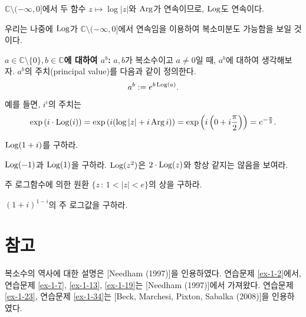$\mathbb C \setminus (-\infty,0]$에서 두 함수  $z\mapsto \log |z|$와 $\mathop{\mathrm{Arg}}$가 
연속이므로, $\mathop{\mathrm{Log}}$도 연속이다.

우리는 나중에 $\mathop{\mathrm{Log}}$가 $\mathbb C \setminus (-\infty,0]$에서 연속임을 이용하여
복소미분도 가능함을 보일 것이다.

{\bf $a\in \mathbb C\setminus \{0\}, b\in\mathbb C$에 대하여 $a^b$: }
$a,b$가 복소수이고 $a\ne0$일 때, $a^b$에 대하여 생각해보자.
$a^b$의 주치(principal value)를 다음과 같이 정의한다.
$$
a^b := e^{b\mathop{\mathrm{Log}}(a)}.
$$
예를 들면, $i^i$의 주치는
$$
\exp\left( i\cdot \mathop{\mathrm{Log}}(i) \right)
= \exp \left( i(\log|z| + i\mathop{\mathrm{Arg}} i) \right)
= \exp \left( i \left(0 + i\frac\pi2\right) \right) 
= e^{-\frac\pi2}.
$$

\begin{salt_exercise}\label{ex-1-40}
$\mathop{\mathrm{Log}} (1+i)$를 구하라.
\end{salt_exercise}

\begin{salt_exercise}\label{ex-1-41}
$\mathop{\mathrm{Log}}(-1)$과 $\mathop{\mathrm{Log}}(1)$을 구하라.
$\mathop{\mathrm{Log}}(z^ 2)$은 $2\cdot \mathop{\mathrm{Log}}(z)$와 항상 같지는 않음을 보여라.
\end{salt_exercise}

\begin{salt_exercise}\label{ex-42}
주 로그함수에 의한 원환 $\{ z\,:\, 1 < |z| <e \}$의 상을 구하라.
\end{salt_exercise}

\begin{salt_exercise}\label{ex-43}
$(1+i)^{1-i}$의 주 로그값을 구하라.
\end{salt_exercise}

\section{참고}
복소수의 역사에 대한 설명은 [Needham (1997)]을 인용하였다. %
연습문제 \ref{ex-1-2}\는 [Shastri (2000)]에서, 
연습문제 \ref{ex-1-7},  \ref{ex-1-13}, \ref{ex-1-19}는 [Needham (1997)]에서 가져왔다.
연습문제 \ref{ex-1-23}, 연습문제 \ref{ex-1-34}는 [Beck, Marchesi, Pixton, Sabalka (2008)]을 인용하였다.



